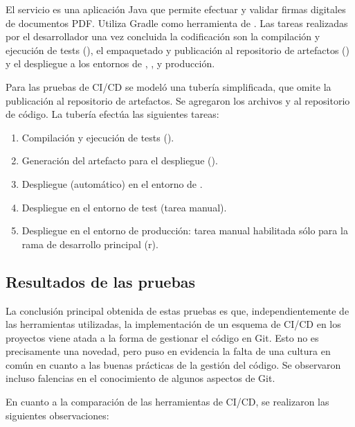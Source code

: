 El servicio es una aplicación Java que permite efectuar y validar
firmas digitales de documentos PDF. Utiliza Gradle como herramienta de
. Las tareas realizadas por el desarrollador una vez
concluida la codificación son la compilación y ejecución de tests
(), el empaquetado y publicación al repositorio
de artefactos () y el despliegue a los entornos
de , , y producción.

Para las pruebas de CI/CD se modeló una tubería simplificada, que
omite la publicación al repositorio de artefactos. Se agregaron los
archivos  y  al repositorio
de código. La tubería efectúa las siguientes tareas:

\begin{enumerate}
\item Compilación y ejecución de tests ().
\item Generación del artefacto para el despliegue ().
\item Despliegue (automático) en el entorno de .
\item Despliegue en el entorno de test (tarea manual).
\item Despliegue en el entorno de producción: tarea manual habilitada
  sólo para la rama de desarrollo principal (r).
\end{enumerate}
\subsection{Resultados de las pruebas}

La conclusión principal obtenida de estas pruebas es que,
independientemente de las herramientas utilizadas, la implementación
de un esquema de CI/CD en los proyectos viene atada a la forma de
gestionar el código en Git. Esto no es precisamente una novedad, pero
puso en evidencia la falta de una cultura en común en cuanto a las
buenas prácticas de la gestión del código. Se observaron incluso
falencias en el conocimiento de algunos aspectos de Git.

En cuanto a la comparación de las herramientas de CI/CD, se realizaron
las siguientes observaciones:

